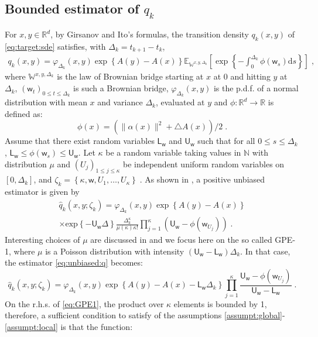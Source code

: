 \documentclass[12pt]{article}
\newcommand{\rmd}{\mathrm{d}}
\newcommand{\eqsp}{\;}
\newcommand{\1}{\mathrm{1}}
\newcommand{\mw}{\mathsf{w}}%
\newcommand{\U}{\mathsf{U}}
\newcommand{\Lo}{\mathsf{L}}
\begin{document}
\subsection*{Bounded estimator of $q_k$}
For $x, y \in \mathbb{R}^d$, by Girsanov and Ito's formulas, the transition density $q_k(x,y)$ of \eqref{eq:target:sde} satisfies, with $\Delta_k = t_{k+1}-t_k$,
\begin{align*}
q_k(x,y)=\varphi_{\Delta_k}(x,y)\exp\left\lbrace A(y)-A(x)\right\rbrace \mathbb{E}_{\mathbb{W}^{x,y,\Delta_k}}\left[ \exp \left\lbrace - \int_0^{\Delta_k} \phi(\mw_s)\rmd s \right\rbrace \right]\eqsp,
\end{align*}
where $\mathbb{W}^{x,y,\Delta_k}$ is the law of Brownian bridge starting at $x$ at 0 and hitting $y$ at $\Delta_k$, $(\mw_t)_{0\leq t \leq \Delta_k}$ is such a Brownian bridge, $\varphi_{\Delta_k}(x,y)$ is the p.d.f. of a normal distribution with mean $x$ and variance $\Delta_k$, evaluated at $y$ and $\phi:\mathbb{R}^d\to\mathbb{R}$ is defined as:
\[
\phi(x) =\left(\|\alpha(x)\|^2  + \triangle A(x)\right)/2\eqsp.
\]
Assume that there exist random variables $\Lo_\mw$ and $\U_\mw$ such that for all $0\leq s \leq \Delta_k$, $\Lo_\mw \leq \phi(\mw_s)\leq \U_\mw$.
Let $\kappa$ be a random variable taking values in $\mathbb{N}$ with distribution $\mu$ and $(U_j)_{1\le j\le \kappa}$ be independent uniform random variables on $[0,\Delta_k]$, and $
\zeta_k = \left\{\kappa,\mw,U_1,\ldots,U_\kappa\right\}\eqsp$. 
As shown in \cite{fearnhead:papaspiliopoulos:roberts:2008}, a positive unbiased estimator is given by 
\begin{multline}
\widehat{q}_k(x,y;\zeta_k) = \varphi_{\Delta_k}(x,y) \exp \left\{A(y) - A(x)\right\}\\ 
\times\mathrm{exp}\left\{-\U_\mw\Delta\right\}\frac{\Delta_k^{\kappa}}{\mu(\kappa)\kappa!}\prod_{j=1}^{\kappa}\left(\U_\mw-\phi(\mw_{U_j})\right)\eqsp.\label{eq:unbiased:q}
\end{multline}
Interesting choices of $\mu$ are discussed in \cite{fearnhead:papaspiliopoulos:roberts:2008} and we focus here on the so called GPE-1, where $\mu$ is a Poisson distribution with intensity $(\U_\mw-\Lo_\mw)\Delta_k$. 
In that case, the estimator \eqref{eq:unbiased:q} becomes:
\begin{equation}
\widehat{q}_{k}(x,y;\zeta_k) = \varphi_{\Delta_k}(x,y) \exp \left\{A(y) - A(x)- \Lo_\mw\Delta_k \right\}\prod_{j=1}^{\kappa}\frac{\U_\mw-\phi(\mw_{U_j})}{\U_\mw-\Lo_\mw}\eqsp.\label{eq:GPE1}
\end{equation}
On the r.h.s. of \eqref{eq:GPE1}, the product over $\kappa$ elements is bounded by 1, therefore, a sufficient condition to satisfy of the assumptions \eqref{assumpt:global}-\eqref{assumpt:local} is that the function:
\end{document}
